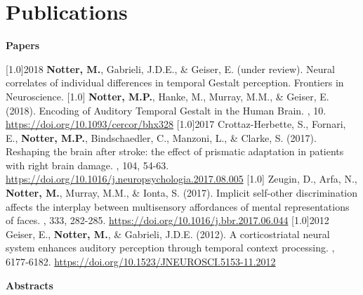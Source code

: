 \documentclass[english]{cv-style}
\begin{document}
\newpage


\section{Publications}

\large\textbf{Papers}\normalsize

\begin{publist}
\publications
  {\scalebox{.8}[1.0]{2018}}
  {\textbf{Notter, M.}, Gabrieli, J.D.E., \& Geiser, E. (under review). Neural correlates of individual differences in temporal Gestalt perception. Frontiers in Neuroscience.}
\publications
  {\scalebox{.8}[1.0]{}}
  {\textbf{Notter, M.P.}, Hanke, M., Murray, M.M., \& Geiser, E. (2018). Encoding of Auditory Temporal Gestalt in the Human Brain. \color{gray}, 10. \href{https://doi.org/10.1093/cercor/bhx328}{https://doi.org/10.1093/cercor/bhx328}}
\publications
  {\scalebox{.8}[1.0]{2017}}
  {Crottaz-Herbette, S., Fornari, E., \textbf{Notter, M.P.}, Bindschaedler, C., Manzoni, L., \& Clarke, S. (2017). Reshaping the brain after stroke: the effect of prismatic adaptation in patients with right brain damage. \color{gray}, 104, 54-63. \href{https://doi.org/10.1016/j.neuropsychologia.2017.08.005}{https://doi.org/10.1016/j.neuropsychologia.2017.08.005}}
\publications
  {\scalebox{.8}[1.0]{}}
  {Zeugin, D., Arfa, N., \textbf{Notter, M.}, Murray, M.M., \& Ionta, S. (2017). Implicit self-other discrimination affects the interplay between multisensory affordances of mental representations of faces. \color{gray}, 333, 282-285. \href{https://doi.org/10.1016/j.bbr.2017.06.044}{https://doi.org/10.1016/j.bbr.2017.06.044}}
\publications
  {\scalebox{.8}[1.0]{2012}}
  {Geiser, E., \textbf{Notter, M.}, \& Gabrieli, J.D.E. (2012). A corticostriatal neural system enhances auditory perception through temporal context processing. \color{gray}, 6177‐6182. \href{https://doi.org/10.1523/JNEUROSCI.5153-11.2012}{https://doi.org/10.1523/JNEUROSCI.5153-11.2012}}
\end{publist}

\large\textbf{Abstracts}\normalsize
\end{document}
